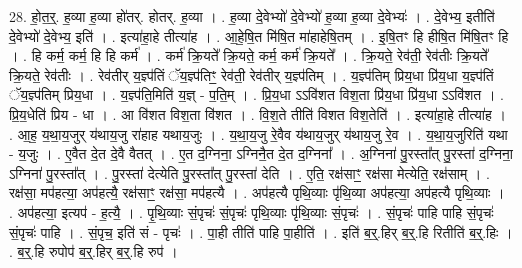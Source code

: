 \documentclass[17pt]{extarticle}
\begin{document}
28. हो॒त॒र्॒. ह॒व्या ह॒व्या हो॑तर्. होतर्. ह॒व्या । . ह॒व्या दे॒वेभ्यो॑ दे॒वेभ्यो॑ ह॒व्या ह॒व्या दे॒वेभ्यः॑ । . दे॒वेभ्य॒ इतीति॑ दे॒वेभ्यो॑ दे॒वेभ्य॒ इति॑ । . इत्या॑हा॒हे तीत्या॑ह । . आ॒हे॒षि॒त मि॑षि॒त मा॑हाहेषि॒तम् । . इ॒षि॒तꣳ हि हीषि॒त मि॑षि॒तꣳ हि । . हि कर्म॒ कर्म॒ हि हि कर्म॑ । . कर्म॑ क्रि॒यते᳚ क्रि॒यते॒ कर्म॒ कर्म॑ क्रि॒यते᳚ । . क्रि॒यते॒ रेव॑ती॒ रेव॑तीः क्रि॒यते᳚ क्रि॒यते॒ रेव॑तीः । . रेव॑तीर् य॒ज्ञ्प॑तिं ॅय॒ज्ञ्प॑तिꣳ॒॒ रेव॑ती॒ रेव॑तीर् य॒ज्ञ्प॑तिम् । . य॒ज्ञ्प॑तिम् प्रिय॒धा प्रि॑य॒धा य॒ज्ञ्प॑तिं ॅय॒ज्ञ्प॑तिम् प्रिय॒धा । . य॒ज्ञ्प॑ति॒मिति॑ य॒ज्ञ् - प॒ति॒म् । . प्रि॒य॒धा ऽऽवि॑शत विश॒ता प्रि॑य॒धा प्रि॑य॒धा ऽऽवि॑शत । . प्रि॒य॒धेति॑ प्रिय - धा । . आ वि॑शत विश॒ता वि॑शत । . वि॒श॒ते तीति॑ विशत विश॒तेति॑ । . इत्या॑हा॒हे तीत्या॑ह । . आ॒ह॒ य॒था॒य॒जुर् य॑थाय॒जु रा॑हाह यथाय॒जुः । . य॒था॒य॒जु रे॒वैव य॑थाय॒जुर् य॑थाय॒जु रे॒व । . य॒था॒य॒जुरिति॑ यथा - य॒जुः । . ए॒वैत दे॒त दे॒वै वैतत् । . ए॒त द॒ग्निना॒ ऽग्निनै॒त दे॒त द॒ग्निना᳚ । . अ॒ग्निना॑ पु॒रस्ता᳚त् पु॒रस्ता॑ द॒ग्निना॒ ऽग्निना॑ पु॒रस्ता᳚त् । . पु॒रस्ता॑ देत्येति पु॒रस्ता᳚त् पु॒रस्ता॑ देति । . ए॒ति॒ रक्ष॑साꣳ॒॒ रक्ष॑सा मेत्येति॒ रक्ष॑साम् । . रक्ष॑सा॒ मप॑हत्या॒ अप॑हत्यै॒ रक्ष॑साꣳ॒॒ रक्ष॑सा॒ मप॑हत्यै । . अप॑हत्यै पृथि॒व्याः पृ॑थि॒व्या अप॑हत्या॒ अप॑हत्यै पृथि॒व्याः । . अप॑हत्या॒ इत्यप॑ - ह॒त्यै॒ । . पृ॒थि॒व्याः सं॒पृचः॑ सं॒पृचः॑ पृथि॒व्याः पृ॑थि॒व्याः सं॒पृचः॑ । . सं॒पृचः॑ पाहि पाहि सं॒पृचः॑ सं॒पृचः॑ पाहि । . सं॒पृच॒ इति॑ सं - पृचः॑ । . पा॒ही तीति॑ पाहि पा॒हीति॑ । . इति॑ ब॒र्॒.हिर् ब॒र्॒.हि रितीति॑ ब॒र्॒.हिः । . ब॒र्॒.हि रुपोप॑ ब॒र्॒.हिर् ब॒र्॒.हि रुप॑ । \newline
\end{document}
